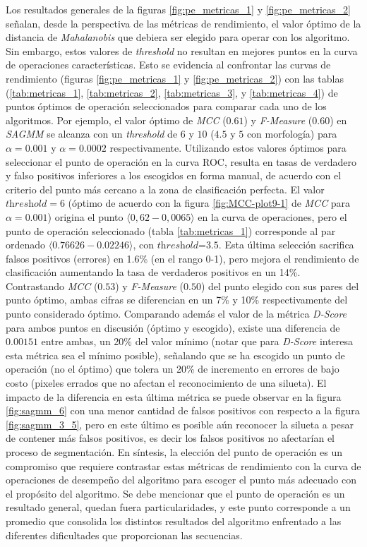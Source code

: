 Los resultados generales de la figuras \ref{fig:pe_metricas_1} y \ref{fig:pe_metricas_2} señalan, desde la perspectiva de las métricas de rendimiento, el valor óptimo de la distancia de \textit{Mahalanobis} que debiera ser elegido para operar con los algoritmo. Sin embargo, estos valores de \textit{threshold} no resultan en mejores puntos en la curva de operaciones características. Esto se evidencia al confrontar las curvas de rendimiento (figuras \ref{fig:pe_metricas_1} y \ref{fig:pe_metricas_2}) con las tablas (\ref{tab:metricas_1}, \ref{tab:metricas_2}, \ref{tab:metricas_3}, y \ref{tab:metricas_4}) de puntos óptimos de operación seleccionados para comparar cada uno de los algoritmos. Por ejemplo, el valor óptimo de \textit{MCC} ($0.61$) y \textit{F-Measure} ($0.60$) en \textit{SAGMM} se alcanza con un \textit{threshold} de $6$ y $10$ ($4.5$ y $5$ con morfología) para $\alpha=0.001$ y $\alpha=0.0002$ respectivamente. Utilizando estos valores óptimos para seleccionar el punto de operación en la curva ROC, resulta en tasas de verdadero y falso positivos inferiores a los escogidos en forma manual, de acuerdo con el criterio del punto más cercano a la zona de clasificación perfecta. El valor $\textit{threshold}=6$ (óptimo de acuerdo con la figura \ref{fig:MCC-plot9-1} de \textit{MCC} para  $\alpha=0.001$) origina el punto $\langle0,62-0,0065\rangle$ en la curva de operaciones, pero el punto de operación seleccionado (tabla \ref{tab:metricas_1}) corresponde al par ordenado $\langle0.76626-0.02246\rangle$, con $\textit{threshold=3.5}$. Esta última selección sacrifica falsos positivos (errores) en 1.6\% (en el rango 0-1), pero mejora el rendimiento de clasificación aumentando la tasa de verdaderos positivos en un 14\%. Contrastando \textit{MCC} ($0.53$) y \textit{F-Measure} ($0.50$) del punto elegido con sus pares del punto óptimo, ambas cifras se diferencian en un 7\% y 10\% respectivamente del punto considerado óptimo. Comparando además el valor de la métrica \textit{D-Score} para ambos puntos en discusión (óptimo y escogido), existe una diferencia de $0.00151$ entre ambas, un 20\% del valor mínimo (notar que para \textit{D-Score} interesa esta métrica sea el mínimo posible), señalando que se ha escogido un punto de operación (no el óptimo) que tolera un 20\% de incremento en errores de bajo costo (pixeles errados que no afectan el reconocimiento de una silueta). El impacto de la diferencia en esta última métrica se puede observar en la figura \ref{fig:sagmm_6} con una menor cantidad de falsos positivos con respecto a la figura \ref{fig:sagmm_3_5}, pero en este último es posible aún reconocer la silueta a pesar de contener más falsos positivos, es decir los falsos positivos no afectarían el proceso de segmentación. En síntesis, la elección del punto de operación es un compromiso que requiere contrastar estas métricas de rendimiento con la curva de operaciones de desempeño del algoritmo para escoger el punto más adecuado con el propósito del algoritmo. Se debe mencionar que el punto de operación es un resultado general, quedan fuera particularidades, y este punto corresponde a un promedio que consolida los distintos resultados del algoritmo enfrentado a las diferentes dificultades que proporcionan las secuencias.

